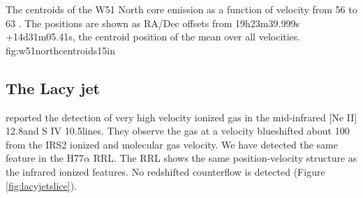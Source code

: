 {The centroids of the W51 North core \ortho \twotwo emission as a function of 
velocity from 56 to 63 \kms.  The positions are shown as RA/Dec offsets from
19h23m39.999s +14d31m05.41s, the centroid position of the mean over all
velocities.}
{fig:w51northcentroids}{1}{5in}

% 
% 


\subsection{The Lacy jet}
\label{sec:lacyjet}
\citet{Lacy2007a} reported the detection of very high velocity ionized gas
in the mid-infrared [Ne II] 12.8\um and S IV 10.5\um lines.  They observe the
gas at a velocity blueshifted about 100 \kms from the IRS2 ionized and molecular
gas velocity.  We have detected the same feature in the H77$\alpha$ RRL.
The RRL shows the same position-velocity structure as the infrared ionized
features.  No redshifted counterflow is detected (Figure \ref{fig:lacyjetslice}).

